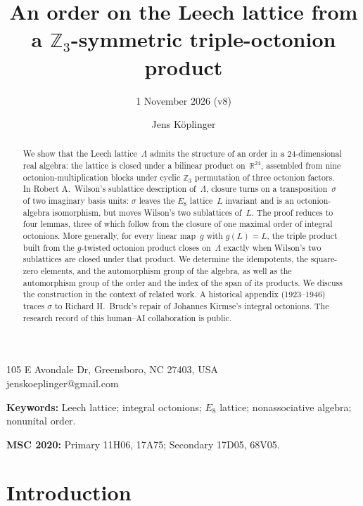 \documentclass[twoside,english]{paper}
\numberwithin{equation}{section}
\numberwithin{figure}{section}
\newcommand{\lyxaddress}[1]{
	\par {\raggedright #1
	\vspace{1.4em}
	\noindent\par}
}
\theoremstyle{definition}
\theoremstyle{remark}
\newcommand{\RR}{\mathbb{R}}
\newcommand{\ZZ}{\mathbb{Z}}
\newcommand{\LL}{\Lambda}             %
\begin{document}
\title{An order on the Leech lattice from a \texorpdfstring{$\ZZ_3$}{Z3}-symmetric
triple-octonion product}
\subtitle{1 November 2026 (v8)}
\author{Jens K\"oplinger}
\maketitle

\lyxaddress{105 E Avondale Dr, Greensboro, NC 27403, USA \\
jenskoeplinger@gmail.com}

\begin{abstract}
We show that the Leech lattice~$\LL$ admits the structure of an order
in a 24-dimensional real algebra: the lattice is closed under a
bilinear product on~$\RR^{24}$, assembled from nine
octonion-multiplication blocks under cyclic $\ZZ_3$ permutation of
three octonion factors.  In Robert A.~Wilson's sublattice description
of~$\LL$, closure turns on a transposition~$\sigma$ of two imaginary
basis units: $\sigma$ leaves the $E_8$ lattice~$L$ invariant and is
an octonion-algebra isomorphism, but moves Wilson's two sublattices
of~$L$.  The proof reduces to four lemmas, three of which
follow from the closure of one maximal order of integral octonions.  More
generally, for every linear map~$g$ with $g(L) = L$, the triple product
built from the $g$-twisted octonion product closes on~$\LL$ exactly when
Wilson's two sublattices are closed under that product.  We
determine the idempotents, the square-zero elements, and the automorphism
group of the algebra, as well as the automorphism group of the order and
the index of the span of its products.  We discuss the construction in the context of related work.
A historical appendix (1923--1946) traces
$\sigma$ to Richard H.~Bruck's repair of Johannes Kirmse's integral
octonions.  The
research record of this human--AI collaboration is public.
\end{abstract}

\medskip
\noindent\textbf{Keywords:} Leech lattice; integral octonions; $E_8$
lattice; nonassociative algebra; nonunital order.

\smallskip
\noindent\textbf{MSC 2020:} Primary 11H06, 17A75; Secondary 17D05,
68V05.

\section{Introduction}\label{sec:intro}
\end{document}
